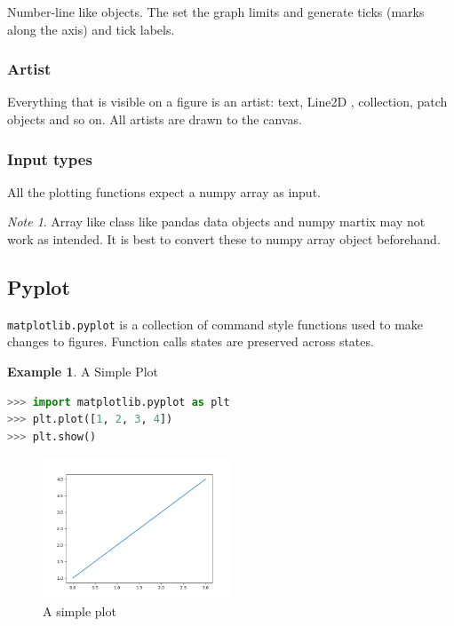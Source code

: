 \documentclass{article}
\theoremstyle{definition}
\newtheorem{ex}{Example}[subsection]
\theoremstyle{remark}
\newtheorem*{nb}{Note}
\begin{document}
Number-line like objects. The set the graph limits and generate ticks (marks along the axis) and tick labels. 


\subsubsection{Artist}

Everything that is visible on a figure is an artist: text,  Line2D , collection, patch objects and so on. All artists are drawn to the canvas.


\subsubsection{Input types}

All the plotting functions expect a numpy array as input.

\begin{nb}
Array like class like pandas data objects and numpy martix may not work as intended. It is best to convert these to numpy array object beforehand.
\end{nb}


\break


\subsection{Pyplot}

\lstinline{matplotlib.pyplot} is a collection of command style functions used to make changes to figures. Function calls states are preserved across states. 

\begin{ex}A Simple Plot
\begin{lstlisting}[language=Python]
>>> import matplotlib.pyplot as plt
>>> plt.plot([1, 2, 3, 4])
>>> plt.show()
\end{lstlisting}
\begin{figure}[h!]
    \centering
    \includegraphics[width=0.5\textwidth]{matplotlib_simple_plot}
    \caption{A simple plot}
    \label{fig:simple_plot}
\end{figure}
\end{ex}
\end{document}
